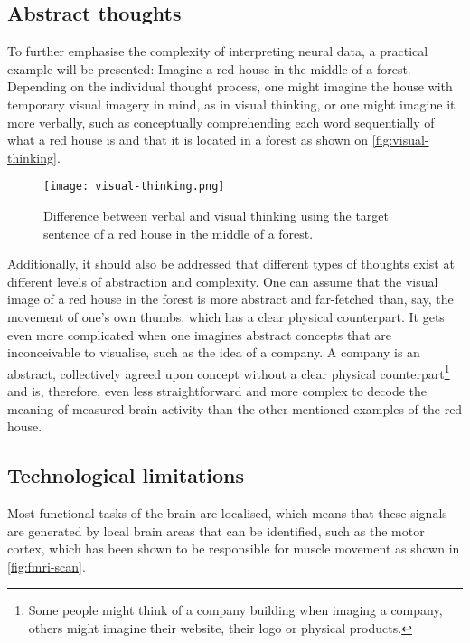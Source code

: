 \subsection{Abstract thoughts}
\label{chapter2-abstract-thoughts}

To further emphasise the complexity of interpreting neural data, a practical example will be presented: Imagine a red house in the middle of a forest. Depending on the individual thought process, one might imagine the house with temporary visual imagery in mind, as in visual thinking, or one might imagine it more verbally, such as conceptually comprehending each word sequentially of what a red house is and that it is located in a forest \citep{amit_asymmetrical_2017} as shown on \autoref{fig:visual-thinking}.

\begin{figure}[ht]
  \centering
  \texttt{[image: visual-thinking.png]}
  \caption{Difference between verbal and visual thinking using the target sentence of a red house in the middle of a forest.}
  \label{fig:visual-thinking}
\end{figure}

Additionally, it should also be addressed that different types of thoughts exist at different levels of abstraction and complexity. One can assume that the visual image of a red house in the forest is more abstract and far-fetched than, say, the movement of one's own thumbs, which has a clear physical counterpart. It gets even more complicated when one imagines abstract concepts that are inconceivable to visualise, such as the idea of a company. A company is an abstract, collectively agreed upon concept without a clear physical counterpart\footnote{Some people might think of a company building when imaging a company, others might imagine their website, their logo or physical products.} and is, therefore, even less straightforward and more complex to decode the meaning of measured brain activity than the other mentioned examples of the red house.

\subsection{Technological limitations}
\label{chapter2-technological-limitations}

Most functional tasks of the brain are localised, which means that these signals are generated by local brain areas that can be identified, such as the motor cortex, which has been shown to be responsible for muscle movement as shown in \autoref{fig:fmri-scan}.

